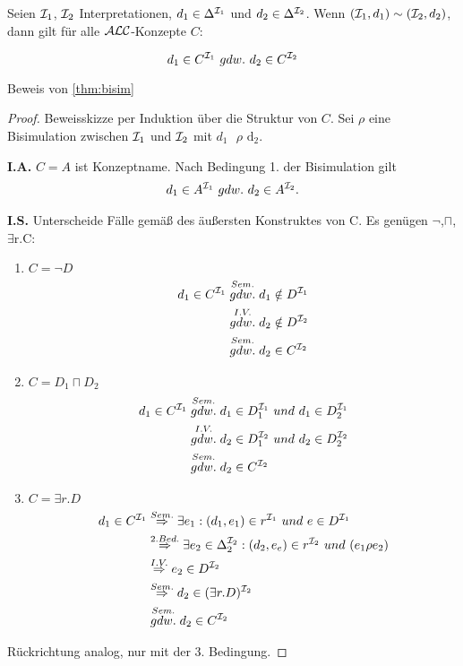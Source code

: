 \begin{theorem}[Bisimulationstheorem]
    \label{thm:bisim}
Seien $\mathcal{I}_{1}$, $\mathcal{I}_{2}$ Interpretationen,
$d_{1} \in \Delta^{\mathcal{I}_{1}}$ und $d_{2} \in \Delta^{\mathcal{I}_{2}}$. Wenn
$(\mathcal{I}_{1},d_{1}) \sim (\mathcal{I}_{2},d_{2})$, dann gilt für alle $\mathcal{A}\mathcal{L}\mathcal{C}$-Konzepte
$C$:

$$d_{1} \in C^{\mathcal{I}_{1}}\ gdw.\ d_{2} \in C^{\mathcal{I}_{2}}$$
\end{theorem}

\begin{tafel} Beweis von \autoref{thm:bisim}
\begin{proof}
Beweisskizze per Induktion über die Struktur von $C$. Sei $\rho$ eine
Bisimulation zwischen $\mathcal{I}_{1}$ und $\mathcal{I}_{2}$ mit
$d_{1}\text{\ $\rho$}\text{\ d}_{2}$.

\textbf{I.A.} $C = A$ ist Konzeptname. Nach Bedingung 1. der
Bisimulation gilt
\begin{align*}
    d_{1} \in A^{\mathcal{I}_{1}}\ gdw.\ d_{2} \in A^{\mathcal{I}_{2}}.
\end{align*}


\textbf{I.S.} Unterscheide Fälle gemäß des äußersten Konstruktes von C.
Es genügen $\neg$,$\sqcap$, $\exists\text{r.C}$:

\begin{enumerate}
\item
  $C = \neg D$
    \begin{align*}
        d_{1} \in C^{\mathcal{I}_{1}} &\stackrel{Sem.}{gdw.} d_{1} \notin D^{\mathcal{I}_{1}}\\
        &\stackrel{I.V.}{gdw.} d_{2} \notin D^{\mathcal{I}_{2}} \\
        &\stackrel{Sem.}{gdw.} d_{2} \in C^{\mathcal{I}_{2}}
    \end{align*}
\item $C = D_{1} \sqcap D_{2}$
  \begin{align*}
d_{1} \in C^{\mathcal{I}_{1}} &\stackrel{Sem.}{gdw.} d_{1} \in D_{1}^{\mathcal{I}_{1}}\ und\ d_{1} \in D_{2}^{\mathcal{I}_{1}}\\
&\stackrel{I.V.}{gdw.} d_{2} \in D_{1}^{\mathcal{I}_{2}}\ und\ d_{2} \in D_{2}^{\mathcal{I}_{2}} \\
&\stackrel{Sem.}{gdw.} d_{2} \in C^{\mathcal{I}_{2}}
\end{align*}

\item $C = \exists r.D$
  \begin{align*}
d_{1} \in C^{\mathcal{I}_{1}} &\stackrel{Sem.}{\Rightarrow} \exists e_1 : (d_1,e_1) \in r^{\mathcal{I}_1}\ und\ e \in D^{\mathcal{I}_1}\\
&\stackrel{2.Bed.}{\Rightarrow} \exists e_2 \in \Delta_2^{\mathcal{I}_2}: (d_2,e_e) \in r^{\mathcal{I}_2}\ und\ (e_1 \rho e_2) \\
&\stackrel{I.V.}{\Rightarrow} e_2 \in D^{\mathcal{I}_2} \\
&\stackrel{Sem.}{\Rightarrow} d_{2} \in (\exists r.D)^{\mathcal{I}_2} \\
&\stackrel{Sem.}{gdw.} d_2 \in C^{\mathcal{I}_{2}}
\end{align*}
\end{enumerate}
Rückrichtung analog, nur mit der 3. Bedingung.
\end{proof}
\end{tafel}

